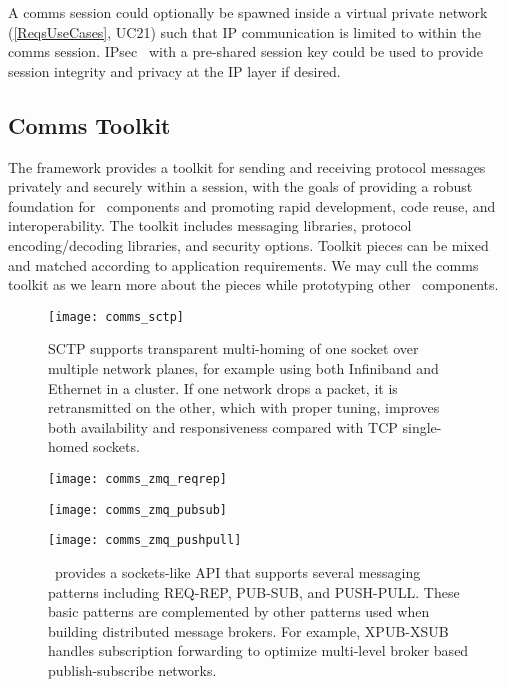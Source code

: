 A comms session could optionally be spawned inside a virtual private
network (\ref{ReqsUseCases}, UC21) such that IP communication
is limited to within the comms session.  IPsec~\cite{rfc2401} with
a pre-shared session key could be used to provide session integrity and
privacy at the IP layer if desired.

\subsection{Comms Toolkit}

The framework provides a toolkit for sending and receiving
protocol messages privately and securely within a session,
with the goals of providing a robust foundation for \ngrm\ components
and promoting rapid development, code reuse, and interoperability.
The toolkit includes messaging libraries,
protocol encoding/decoding libraries, and security options.
Toolkit pieces can be mixed and matched according to application
requirements.  We may cull the comms toolkit as we learn more
about the pieces while prototyping other \ngrm\ components.

\begin{figure}
\centering
\texttt{[image: comms\_sctp]}
\caption{SCTP supports transparent multi-homing of one socket over multiple
network planes, for example using both Infiniband and Ethernet in a cluster.
If one network drops a packet, it is retransmitted on the other, which with
proper tuning, improves both availability and responsiveness compared with
TCP single-homed sockets.}
\label{FigCommsSCTP}
\end{figure}

\begin{figure}
\begin{minipage}[b]{0.15\linewidth}
\texttt{[image: comms\_zmq\_reqrep]}
\end{minipage}
\hspace{0.5cm}
\begin{minipage}[b]{0.4\linewidth}
\texttt{[image: comms\_zmq\_pubsub]}
\end{minipage}
\hspace{0.5cm}
\begin{minipage}[b]{0.4\linewidth}
\texttt{[image: comms\_zmq\_pushpull]}
\end{minipage}
\caption{\zMQ\ provides a sockets-like API that supports several
messaging patterns including REQ-REP, PUB-SUB, and PUSH-PULL.
These basic patterns are complemented by other patterns used when
building distributed message brokers.  For example, XPUB-XSUB handles
subscription forwarding to optimize multi-level broker based
publish-subscribe networks.}
\label{FigCommsZmq}
\end{figure}

